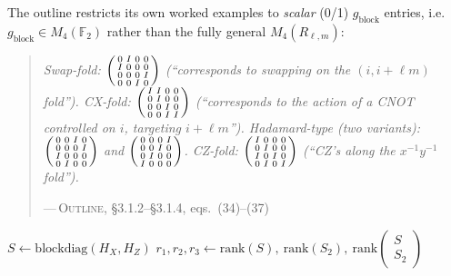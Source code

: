 \documentclass[11pt]{article}
\theoremstyle{plain}
\theoremstyle{definition}
\newenvironment{paperquote}[1]{%
  \def\paperquotecite{#1}%
  \begin{quotation}\noindent\itshape\small
}{%
  \normalfont\par\hfill---\,\textsc{Outline}, \paperquotecite\medskip
  \end{quotation}
}
\newcommand{\pq}[2]{\begin{paperquote}{#1}#2\end{paperquote}}
\begin{document}
The outline restricts its own worked examples to \emph{scalar} (0/1)
$g_{\mathrm{block}}$ entries, i.e.\ $g_{\mathrm{block}}\in M_4(\mathbb{F}_2)$
rather than the fully general $M_4(R_{\ell,m})$:

\pq{\S3.1.2--\S3.1.4, eqs.\ (34)--(37)}{%
Swap-fold: $\begin{psmallmatrix}0&I&0&0\\I&0&0&0\\0&0&0&I\\0&0&I&0\end{psmallmatrix}$
(``corresponds to swapping on the $(i,i+\ell m)$ fold'').
CX-fold: $\begin{psmallmatrix}I&I&0&0\\0&I&0&0\\0&0&I&0\\0&0&I&I\end{psmallmatrix}$
(``corresponds to the action of a CNOT controlled on $i$, targeting
$i+\ell m$'').
Hadamard-type (two variants): $\begin{psmallmatrix}0&0&I&0\\0&0&0&I\\I&0&0&0\\0&I&0&0\end{psmallmatrix}$
and $\begin{psmallmatrix}0&0&0&I\\0&0&I&0\\0&I&0&0\\I&0&0&0\end{psmallmatrix}$.
CZ-fold: $\begin{psmallmatrix}I&0&0&0\\0&I&0&0\\I&0&I&0\\0&I&0&I\end{psmallmatrix}$
(``CZ's along the $x^{-1}y^{-1}$ fold'').
}

\begin{algorithm}[H]
\caption{Full stabilizer-module symmetry test (realizes Thm.\ 3.2, restricted to $\psi_L=\psi_R$ and scalar $g_{\mathrm{block}}$)}
$S \gets \mathrm{blockdiag}(H_X,H_Z)$ 
$r_1,r_2,r_3 \gets \mathrm{rank}(S),\ \mathrm{rank}(S_2),\ \mathrm{rank}\!\begin{pmatrix}S\\S_2\end{pmatrix}$\;
 
\end{algorithm}
\end{document}

